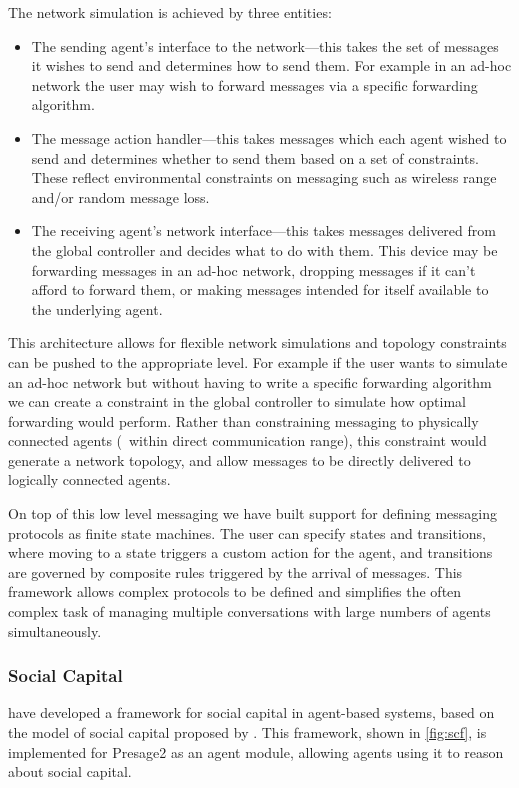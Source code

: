 The network simulation is achieved by three entities:
\begin{itemize}
	\item The sending agent's interface to the network---this takes the set
	of messages it wishes to send and determines how to send them. For
	example in an ad-hoc network the user may wish to forward messages
	via a specific forwarding algorithm. 
	\item The message action handler---this takes messages which each agent
	wish\-ed to send and determines whether to send them based on a set
	of constraints. These reflect environmental constraints on messaging
	such as wireless range and/or random message loss.
	\item The receiving agent's network interface---this takes messages delivered
	from the global controller and decides what to do with them. This
	device may be forwarding messages in an ad-hoc network, dropping messages
	if it can't afford to forward them, or making messages intended for
	itself available to the underlying agent.
\end{itemize}

This architecture allows for flexible network simulations and topology
constraints can be pushed to the appropriate level. For example if the user
wants to simulate an ad-hoc network but without having to write a specific
forwarding algorithm we can create a constraint in the global controller to
simulate how optimal forwarding would perform. Rather than constraining
messaging to physically connected agents (\ie\ within direct communication
range), this constraint would generate a network topology, and allow messages
to be directly delivered to logically connected agents.

On top of this low level messaging we have built support for defining
messaging protocols as finite state machines. The user can specify
states and transitions, where moving to a state triggers a custom
action for the agent, and transitions are governed by composite rules
triggered by the arrival of messages. This framework allows complex
protocols to be defined and simplifies the often complex task of
managing multiple conversations with large numbers of agents simultaneously.

\subsubsection*{Social Capital}

\citet{Petruzzi2014} have developed a framework for social capital in 
agent-based systems, based on the model of social capital proposed by
\citet{ostromahn2003}. This framework, shown in \autoref{fig:scf}, is
implemented for Presage2 as an agent module, allowing agents using it to
reason about social capital.

